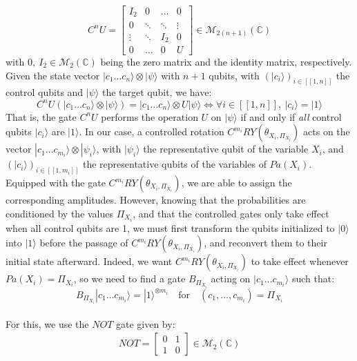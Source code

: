 \[C^nU =
\left[
\begin{array}{cccc}
    I_2 & 0 & \hdots & 0 \\
    0 & \ddots & \ddots & \vdots \\
    \vdots & \ddots & I_2 & 0 \\
    0 & \hdots & 0 & U
\end{array}
\right]
\in \mathcal{M}_{2(n+1)}(\mathbb{C})
\]
with $0, \ I_2 \in \mathcal{M}_2(\mathbb{C})$ being the zero matrix and the identity matrix, respectively. 
\\
Given the state vector $|c_1 \hdots c_n\rangle \otimes |\psi\rangle$ with $n+1$ qubits, with $(|c_i\rangle)_{i\in[\![1,n]\!]}$ the control qubits and $|\psi\rangle$ the target qubit, we have:
\[C^nU(|c_1 \hdots c_n\rangle \otimes |\psi\rangle) = |c_1 \hdots c_n\rangle \otimes U|\psi\rangle \iff \forall i \in [\![1,n]\!], \ |c_i\rangle = |1\rangle \]
That is, the gate $C^nU$ performs the operation $U$ on $|\psi\rangle$ if and only if \textit{all} control qubits $|c_i\rangle$ are $|1\rangle$. 
In our case, a controlled rotation $C^{m_i}RY(\theta_{X_i, \Pi_{X_i}})$ acts on the vector $|c_1 \hdots c_{m_i}\rangle \otimes |\psi_i\rangle$, with $|\psi_i\rangle$ the representative qubit of the variable $X_i$, and $(|c_i\rangle)_{i\in[\![1,m_i]\!]}$ the representative qubits of the variables of $ Pa(X_i)$.
\\
Equipped with the gate $C^{m_i}RY(\theta_{X_i, \Pi_{X_i}})$, we are able to assign the corresponding amplitudes. However, knowing that the probabilities are conditioned by the values $\Pi_{X_i}$, and that the controlled gates only take effect when all control qubits are 1, we must first transform the qubits initialized to $|0\rangle$ into $|1\rangle$ before the passage of $C^{m_i}RY(\theta_{X_i, \Pi_{X_i}})$, and reconvert them to their initial state afterward.
Indeed, we want $C^{m_i}RY(\theta_{X_i, \Pi_{X_i}})$ to take effect whenever $Pa(X_i)=\Pi_{X_i}$, so we need to find a gate $B_{\Pi_{X_i}}$ acting on $|c_1 \hdots c_{m_i}\rangle$ such that:
\[
B_{\Pi_{X_i}}|c_1 \hdots c_{m_i}\rangle = |1\rangle^{\otimes m_i} \quad \mathrm{for} \quad (c_1,\hdots,c_{m_i}) = \Pi_{X_i}
\]
\\
For this, we use the $NOT$ gate given by:
\begin{align*}
NOT =
\left[
\begin{array}{cc}
    0 & 1 \\
    1 & 0
\end{array}
\right]
\in \mathcal{M}_{2}(\mathbb{C}) 
\end{align*}
